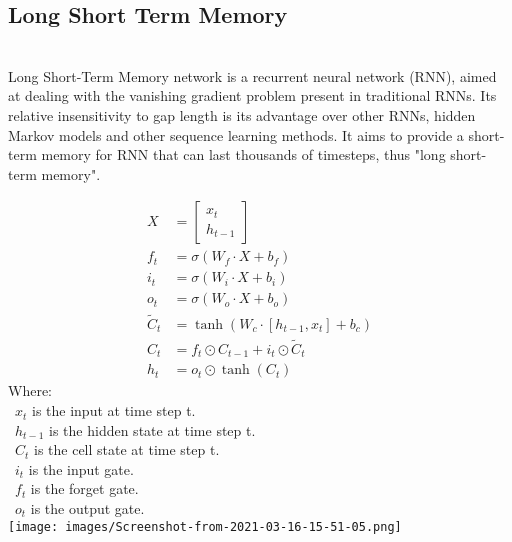 \documentclass{ieeeojies}
\begin{document}
\subsection{Long Short Term Memory}\\
Long Short-Term Memory network is a recurrent neural network (RNN), aimed at dealing with the vanishing gradient problem present in traditional RNNs. Its relative insensitivity to gap length is its advantage over other RNNs, hidden Markov models and other sequence learning methods. It aims to provide a short-term memory for RNN that can last thousands of timesteps, thus "long short-term memory".

\begin{align*}
X &= \begin{bmatrix}
    x_t \\
    h_{t-1}
\end{bmatrix} \\
f_t &= \sigma(W_f \cdot X + b_f) \\
i_t &= \sigma(W_i \cdot X + b_i) \\
o_t &= \sigma(W_o \cdot X + b_o) \\
\tilde{C}_t &= \tanh(W_c \cdot [h_{t-1}, x_t] + b_c) \\
C_t &= f_t \odot C_{t-1} + i_t \odot \tilde{C}_t \\
h_t &= o_t \odot \tanh(C_t)
\end{align*}
Where:\\
\indent \textbullet\ \(x_t\) is the input at time step t.\\
\indent \textbullet\ \(h_{t-1}\) is the hidden state at time step t.\\
\indent \textbullet\ \(C_t\) is the cell state at time step t.\\
\indent \textbullet\ \(i_t\) is the input gate.\\
\indent \textbullet\ \(f_t\) is the forget gate.\\
\indent \textbullet\ \(o_t\) is the output gate.\\
\texttt{[image: images/Screenshot-from-2021-03-16-15-51-05.png]}
\end{document}
